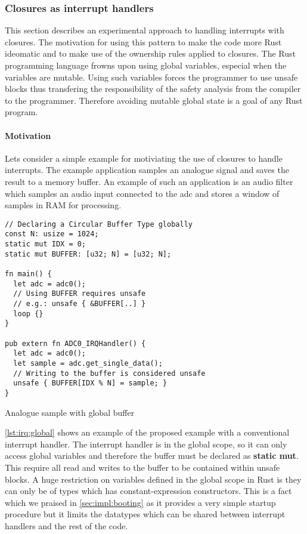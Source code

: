 \subsubsection{Closures as interrupt handlers}
\label{sec:irq-closures}

This section describes an experimental approach to handling interrupts with closures.
The motivation for using this pattern to make the code more Rust ideomatic and to make use of the ownership rules applied to closures.
The Rust programming language frowns upon using global variables, especial when the variables are mutable.
Using such variables forces the programmer to use unsafe blocks thus transfering the responsibility of the safety analysis from the compiler to the programmer.
Therefore avoiding mutable global state is a goal of any Rust program.

\paragraph{Motivation}
\label{par:irq:motivation}

Lets consider a simple example for motiviating the use of closures to handle interrupts.
The example application samples an analogue signal and saves the result to a memory buffer.
An example of such an application is an audio filter which samples an audio input connected to the \gls{adc} and stores a window of samples in RAM for processing.

\begin{listing}[H]
  \begin{verbatim}
// Declaring a Circular Buffer Type globally
const N: usize = 1024;
static mut IDX = 0;
static mut BUFFER: [u32; N] = [u32; N];

fn main() {
  let adc = adc0();
  // Using BUFFER requires unsafe
  // e.g.: unsafe { &BUFFER[..] }
  loop {}
}

pub extern fn ADC0_IRQHandler() {
  let adc = adc0();
  let sample = adc.get_single_data();
  // Writing to the buffer is considered unsafe
  unsafe { BUFFER[IDX % N] = sample; }
}
  \end{verbatim}
  \caption{Analogue sample with global buffer}
  \label{lst:irq:global}
\end{listing}

\autoref{lst:irq:global} shows an example of the proposed example with a conventional interrupt handler.
The interrupt handler is in the global scope, so it can only access global variables and therefore the buffer must be declared as \textbf{static mut}.
This require all read and writes to the buffer to be contained within unsafe blocks.
A huge restriction on variables defined in the global scope in Rust is they can only be of types which has constant-expression constructors.
This is a fact which we praised in \autoref{sec:impl:booting} as it provides a very simple startup procedure but it limits the datatypes which can be shared between interrupt handlers and the rest of the code.

